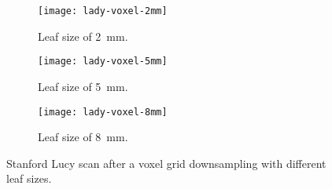 \begin{figure}[h]
    
    \centering
    \begin{subfigure}[t]{0.3\textwidth}
        \centering
        \texttt{[image: lady-voxel-2mm]}
        \caption{Leaf size of \SI{2}{\milli\meter}.}
        \label{figure:lucy-voxel-grid-2mm}
    \end{subfigure}%
    \begin{subfigure}[t]{0.3\textwidth}
        \centering
        \texttt{[image: lady-voxel-5mm]}
        \caption{Leaf size of \SI{5}{\milli\meter}.}
        \label{figure:lucy-voxel-grid-5mm}
    \end{subfigure}%
    \begin{subfigure}[t]{0.3\textwidth}
        \centering
        \texttt{[image: lady-voxel-8mm]}
        \caption{Leaf size of \SI{8}{\milli\meter}.}
        \label{figure:lucy-voxel-grid-8mm}
    \end{subfigure}

    \caption{Stanford Lucy scan after a voxel grid downsampling with different leaf sizes.}
    \label{figure:lucy-voxel-grid}
\end{figure}
